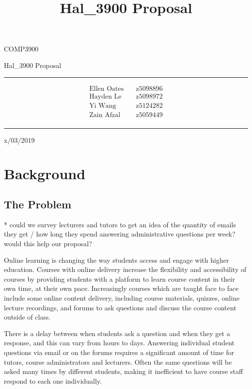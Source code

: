 \documentclass{article}
\title{Hal\_3900 Proposal}
\begin{document}
\begin{LARGE}
\begin{center}
\vspace*{15mm}

COMP3900

Hal\_3900 Proposal

\rule[4.5pt]{0.61\textwidth}{0.3pt}

\begin{align*}
  \text{Ellen Oates}    \quad   &\text{z5098896} \\
  \text{Hayden Le}      \quad   &\text{z5098972} \\
  \text{Yi Wang}        \quad   &\text{z5124282} \\
  \text{Zain Afzal}     \quad   &\text{z5059449} \\
\end{align*}

\rule[4.5pt]{0.61\textwidth}{0.3pt}

x/03/2019

\end{center}
\end{LARGE}
\newpage


\section{Background}

\subsection{The Problem}
* could we survey lecturers and tutors to get an idea of the quantity of emails they get / how long they spend answering administrative questions per week? would this help our proposal?

Online learning is changing the way students access and engage with higher education. Courses with online delivery increase the flexibility and accessibility of courses by providing students with a platform to learn course content in their own time, at their own pace. Increasingly courses which are taught face to face include some online content delivery, including course materials, quizzes, online lecture recordings, and forums to ask questions and discuss the course content outside of class.   

There is a delay between when students ask a question and when they get a response, and this can vary from hours to days. Answering individual student questions via email or on the forums requires a significant amount of time for tutors, course administrators and lecturers. Often the same questions will be asked many times by different students, making it inefficient to have course staff respond to each one individually.
\end{document}
